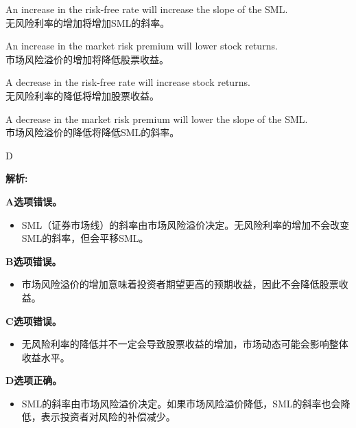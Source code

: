 \documentclass{article}
\newenvironment{explanation}
{\textbf{解析:}\par}
{\par}
\begin{document}
    \begin{choices}
        \item  An increase in the risk-free rate will increase the slope of the SML.  
        \\
        无风险利率的增加将增加SML的斜率。
        \item  An increase in the market risk premium will lower stock returns.  
        \\
        市场风险溢价的增加将降低股票收益。
        \item  A decrease in the risk-free rate will increase stock returns.  
        \\
        无风险利率的降低将增加股票收益。
        \item  A decrease in the market risk premium will lower the slope of the SML.  
        \\
        市场风险溢价的降低将降低SML的斜率。
    \end{choices}
    
    \begin{correctanswer}
    D
    \end{correctanswer}
    
    \begin{explanation}
        \textbf{A选项错误。}
        \begin{itemize}
            \item SML（证券市场线）的斜率由市场风险溢价决定。无风险利率的增加不会改变SML的斜率，但会平移SML。
        \end{itemize}
    
        \textbf{B选项错误。}
        \begin{itemize}
            \item 市场风险溢价的增加意味着投资者期望更高的预期收益，因此不会降低股票收益。
        \end{itemize}
    
        \textbf{C选项错误。}
        \begin{itemize}
            \item 无风险利率的降低并不一定会导致股票收益的增加，市场动态可能会影响整体收益水平。
        \end{itemize}
    
        \textbf{D选项正确。}
        \begin{itemize}
            \item SML的斜率由市场风险溢价决定。如果市场风险溢价降低，SML的斜率也会降低，表示投资者对风险的补偿减少。
        \end{itemize}
    \end{explanation}
    
\end{document}
